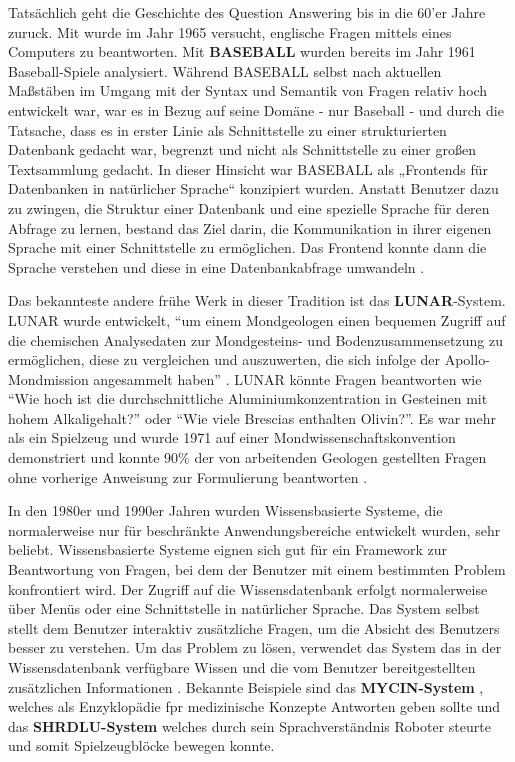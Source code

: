 \documentclass[
        ngerman,
        paper=a4,
        numbers=noendperiod,
]{scrreprt}
\begin{document}
Tatsächlich geht die Geschichte des Question Answering bis in die 60'er Jahre zuruck. Mit \citep{Simmons1964IndexingQuestions} wurde im Jahr 1965 versucht, englische Fragen mittels eines Computers zu beantworten. Mit \textbf{BASEBALL} \citep{Green1961Baseball:Question-answerer} wurden bereits im Jahr 1961 Baseball-Spiele analysiert. Während BASEBALL selbst nach aktuellen Maßstäben im Umgang mit der Syntax und Semantik von Fragen relativ hoch entwickelt war, war es in Bezug auf seine Domäne - nur Baseball - und durch die Tatsache, dass es in erster Linie als Schnittstelle zu einer strukturierten Datenbank gedacht war, begrenzt und nicht als Schnittstelle zu einer großen Textsammlung gedacht. In dieser Hinsicht war BASEBALL als „Frontends für Datenbanken in natürlicher Sprache“ konzipiert wurden. Anstatt Benutzer dazu zu zwingen, die Struktur einer Datenbank und eine spezielle Sprache für deren Abfrage zu lernen, bestand das Ziel darin, die Kommunikation in ihrer eigenen Sprache mit einer Schnittstelle zu ermöglichen. Das Frontend konnte dann die Sprache verstehen und diese in eine Datenbankabfrage umwandeln \citep[S. 279-280]{Hirschman2001NaturalHere}.

Das bekannteste andere frühe Werk in dieser Tradition ist das \textbf{LUNAR}-System. LUNAR wurde entwickelt, \enquote{um einem Mondgeologen einen bequemen Zugriff auf die chemischen Analysedaten zur Mondgesteins- und Bodenzusammensetzung zu ermöglichen, diese zu vergleichen und auszuwerten, die sich infolge der Apollo-Mondmission angesammelt haben} \citep{4-8ProgressGeology} . LUNAR könnte Fragen beantworten wie \enquote{Wie hoch ist die durchschnittliche Aluminiumkonzentration in Gesteinen mit hohem Alkaligehalt?} oder \enquote{Wie viele Brescias enthalten Olivin?}. Es war mehr als ein Spielzeug und wurde 1971 auf einer Mondwissenschaftskonvention demonstriert und konnte 90\% der von arbeitenden Geologen gestellten Fragen ohne vorherige Anweisung zur Formulierung beantworten \citep[S. 280]{Hirschman2001NaturalHere}. 


In den 1980er und 1990er Jahren wurden Wissensbasierte Systeme, die normalerweise nur für beschränkte Anwendungsbereiche entwickelt wurden, sehr beliebt. Wissensbasierte Systeme  eignen sich gut für ein Framework zur Beantwortung von Fragen, bei dem der Benutzer mit einem bestimmten Problem konfrontiert wird. Der Zugriff auf die Wissensdatenbank erfolgt normalerweise über Menüs oder eine Schnittstelle in natürlicher Sprache. Das System selbst stellt dem Benutzer interaktiv zusätzliche Fragen, um die Absicht des Benutzers besser zu verstehen. Um das Problem zu lösen, verwendet das System das in der Wissensdatenbank verfügbare Wissen und die vom Benutzer bereitgestellten zusätzlichen Informationen \citep [S. 5415]{Kolomiyets2011APerspective}. Bekannte Beispiele sind das \textbf{MYCIN-System} \citep{edward1976shortliffe}, welches als Enzyklopädie fpr medizinische Konzepte Antworten geben sollte und das \textbf{SHRDLU-System} \citep{winograd1971procedures} welches durch sein Sprachverständnis Roboter steurte und somit Spielzeugblöcke bewegen konnte.
\end{document}
